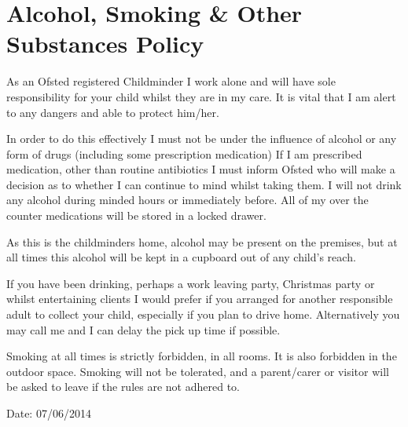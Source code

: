 \documentclass[10pt]{article}
\begin{document}
\section{Alcohol, Smoking \& Other Substances Policy}

As an Ofsted registered Childminder I work alone and will have sole
responsibility for your child whilst they are in my care. It is vital
that I am alert to any dangers and able to protect him/her.

In order to do this effectively I must not be under the influence of
alcohol or any form of drugs (including some prescription medication) If
I am prescribed medication, other than routine antibiotics I must inform
Ofsted who will make a decision as to whether I can continue to mind
whilst taking them. I will not drink any alcohol during minded hours or
immediately before. All of my over the counter medications will be
stored in a locked drawer.

As this is the childminders home, alcohol may be present on the
premises, but at all times this alcohol will be kept in a cupboard out
of any child's reach.

If you have been drinking, perhaps a work leaving party, Christmas party
or whilst entertaining clients I would prefer if you arranged for
another responsible adult to collect your child, especially if you plan
to drive home. Alternatively you may call me and I can delay the pick up
time if possible.

Smoking at all times is strictly forbidden, in all rooms. It is also
forbidden in the outdoor space. Smoking will not be tolerated, and a
parent/carer or visitor will be asked to leave if the rules are not
adhered to.

Date: 07/06/2014

~
\end{document}
